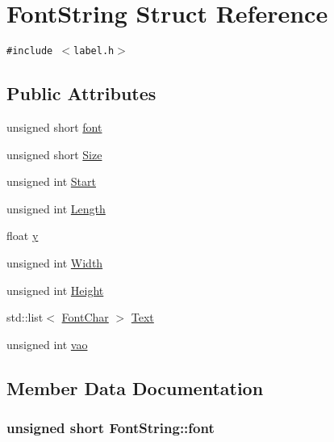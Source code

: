 \hypertarget{struct_font_string}{
\section{FontString Struct Reference}
\label{struct_font_string}
}
{\tt \#include $<$label.h$>$}

\subsection*{Public Attributes}
\begin{CompactItemize}
\item 
unsigned short \hyperlink{struct_font_string_d2c1e3e9f22ac6d449bb3f21e51e264e}{font}
\item 
unsigned short \hyperlink{struct_font_string_90375730bc2a31f1c5370ae71f943201}{Size}
\item 
unsigned int \hyperlink{struct_font_string_11a498d4067ce32aa022d648e6e119f4}{Start}
\item 
unsigned int \hyperlink{struct_font_string_bae6a112a05c0f63972a006d2c71267b}{Length}
\item 
float \hyperlink{struct_font_string_5e6d0dff8c6874f046b8c798a22da79b}{y}
\item 
unsigned int \hyperlink{struct_font_string_dc51468d6fa7d9e1c8a588f98527d956}{Width}
\item 
unsigned int \hyperlink{struct_font_string_3ad567226c58637efe58e4bbf27fe36a}{Height}
\item 
std::list$<$ \hyperlink{struct_font_char}{FontChar} $>$ \hyperlink{struct_font_string_fabc26f743e79215a45d4c1e180ab17d}{Text}
\item 
unsigned int \hyperlink{struct_font_string_bd3dca7357dc9804574b324119b340ae}{vao}
\end{CompactItemize}


\subsection{Member Data Documentation}
\hypertarget{struct_font_string_d2c1e3e9f22ac6d449bb3f21e51e264e}{
\subsubsection[{font}]{\setlength{\rightskip}{0pt plus 5cm}unsigned short {\bf FontString::font}}}
\label{struct_font_string_d2c1e3e9f22ac6d449bb3f21e51e264e}


